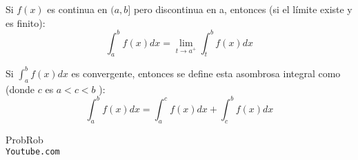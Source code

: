 \documentclass[12pt]{report}                                %
\begin{document}
        Si $f(x)$ es continua en $(a, b]$  pero discontinua en a, entonces
        (si el límite existe y es finito):
        \begin{equation}
            \int_a^b f(x) dx = \lim_{t \to a^+} \int_t^b f(x) dx
        \end{equation}



        Si $\int_a^bf(x)dx$ es convergente, entonces se define esta asombrosa integral
        como (donde $c$ es $a<c<b$ ):
        \begin{equation}
            \int_a^b f(x) dx = \int_a^c f(x) dx + \int_c^b f(x) dx  
        \end{equation}



\clearpage

    \begin{thebibliography}{9}

        ProbRob
        \\\texttt{Youtube.com}


     

\end{thebibliography}
\end{document}

